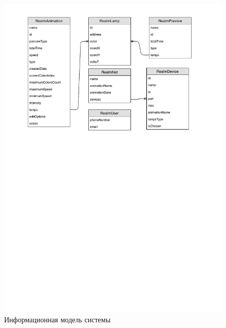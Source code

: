 \newpage
{}
\label{app:er}

~
\begin{figure}[H]
\centering
	\includegraphics[scale=0.8]{figures/diagrams/er_diagram.pdf}
	\caption{Информационная модель системы}
	\label{fig:appendices:er}
\end{figure}
